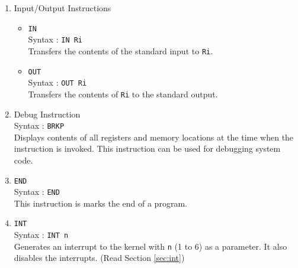 \documentclass[11pt]{report}
\begin{document}
\begin{enumerate}
\item Input/Output Instructions
\begin{itemize}
\item \texttt{IN}\\
Syntax : \texttt{IN Ri}\\
Transfers the contents of the standard input to \texttt{Ri}.
\item \texttt{OUT}\\
Syntax : \texttt{OUT Ri}\\
Transfers the contents of \texttt{Ri} to the standard output.\\
\end{itemize}


\item Debug Instruction\\
Syntax : \texttt{BRKP}\\
Displays contents of all registers and memory locations at the time when the instruction is invoked. This instruction can be used for debugging system code.


\item \texttt{END}\\
Syntax : \texttt{END}\\
This instruction is marks the end of a program.

\item \texttt{INT}\\
Syntax : \texttt{INT n}\\
Generates an interrupt to the kernel with \texttt{n} (1 to 6) as a parameter. It also disables the interrupts. (Read Section \ref{sec:int})



\end{enumerate}
\end{document}
